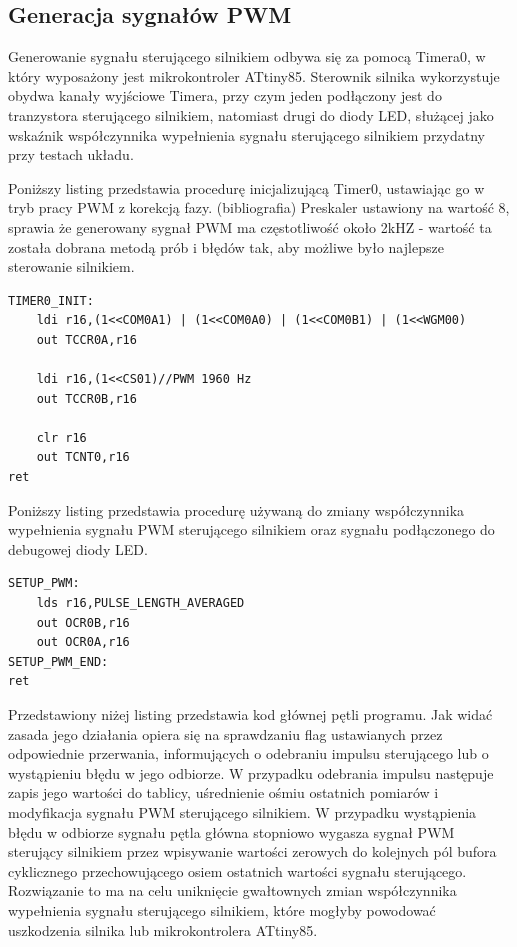 \subsection{Generacja sygnałów PWM}

Generowanie sygnału sterującego silnikiem odbywa się za pomocą Timera0, w który wyposażony jest mikrokontroler ATtiny85. Sterownik silnika wykorzystuje obydwa kanały wyjściowe Timera, przy czym jeden podłączony jest do tranzystora sterującego silnikiem, natomiast drugi do diody LED, służącej jako wskaźnik współczynnika wypełnienia sygnału sterującego silnikiem przydatny przy testach układu. 

Poniższy listing przedstawia procedurę inicjalizującą Timer0, ustawiając go w tryb pracy PWM z korekcją fazy. (bibliografia) Preskaler ustawiony na wartość 8, sprawia że generowany sygnał PWM ma częstotliwość około 2kHZ - wartość ta została dobrana metodą prób i błędów tak, aby możliwe było najlepsze sterowanie silnikiem. 

\begin{lstlisting}
TIMER0_INIT:
	ldi r16,(1<<COM0A1) | (1<<COM0A0) | (1<<COM0B1) | (1<<WGM00)
	out TCCR0A,r16

	ldi r16,(1<<CS01)//PWM 1960 Hz
	out TCCR0B,r16

	clr r16
	out TCNT0,r16
ret
\end{lstlisting}


Poniższy listing przedstawia procedurę używaną do zmiany współczynnika wypełnienia sygnału PWM sterującego silnikiem oraz sygnału podłączonego do debugowej diody LED.

\begin{lstlisting}
SETUP_PWM:
	lds r16,PULSE_LENGTH_AVERAGED
	out OCR0B,r16
	out OCR0A,r16
SETUP_PWM_END:
ret
\end{lstlisting}


Przedstawiony niżej listing przedstawia kod głównej pętli programu. Jak widać zasada jego działania opiera się na sprawdzaniu flag ustawianych przez odpowiednie przerwania, informujących o odebraniu impulsu sterującego lub o wystąpieniu błędu w jego odbiorze. W przypadku odebrania impulsu następuje zapis jego wartości do tablicy, uśrednienie ośmiu ostatnich pomiarów i modyfikacja sygnału PWM sterującego silnikiem. W przypadku wystąpienia błędu w odbiorze sygnału pętla główna stopniowo wygasza sygnał PWM sterujący silnikiem przez wpisywanie wartości zerowych do kolejnych pól bufora cyklicznego przechowującego osiem ostatnich wartości sygnału sterującego. Rozwiązanie to ma na celu uniknięcie gwałtownych zmian współczynnika wypełnienia sygnału sterującego silnikiem, które mogłyby powodować uszkodzenia silnika lub mikrokontrolera ATtiny85.


